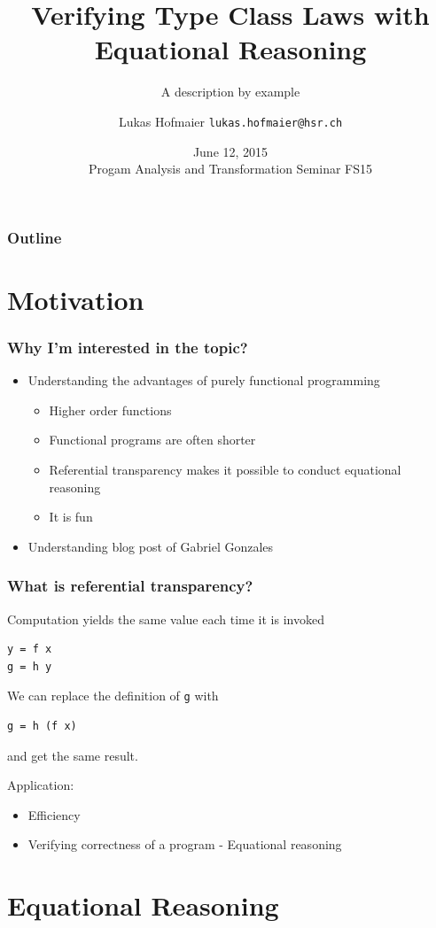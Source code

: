 \documentclass{beamer}
\title{Verifying Type Class Laws with Equational Reasoning}
\subtitle{A description by example}
\author{Lukas Hofmaier \texttt{lukas.hofmaier@hsr.ch}}
\date{June 12, 2015 \\ Progam Analysis and Transformation Seminar FS15}
\begin{document}
\maketitle
\begin{frame}
  \frametitle{Outline}
  \tableofcontents
\end{frame}

\section{Motivation}

\begin{frame}
  \frametitle{Why I'm interested in the topic?}
\begin{itemize}
\item Understanding the advantages of purely functional programming
  \begin{itemize}
  \item Higher order functions
  \item Functional programs are often shorter
  \item {\color{red} Referential transparency makes it possible to conduct equational reasoning}
  \item It is fun
  \end{itemize}
\item Understanding blog post of Gabriel Gonzales
\end{itemize}
\end{frame}

\begin{frame}[fragile]
\frametitle{What is referential transparency?}
Computation yields the same value each time it is invoked
\begin{verbatim}
y = f x
g = h y
\end{verbatim}
We can replace the definition of \verb|g| with
\begin{verbatim}
g = h (f x)
\end{verbatim}
and get the same result.

Application:
\begin{itemize}
\item Efficiency
\item Verifying correctness of a program - Equational reasoning
\end{itemize}
\end{frame}
\section{Equational Reasoning}
\end{document}
